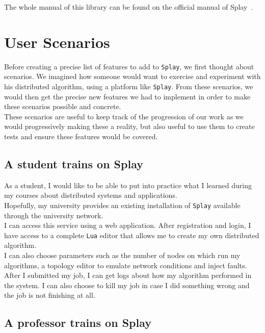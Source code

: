 \documentclass{eplmastersthesis}
\begin{document}
          The whole manual of this library can be found on the official
          manual of Splay~\cite{SplayLib}.


    \section{User Scenarios}

      Before creating a precise list of features to add to \texttt{Splay}, we first
      thought about scenarios. We imagined how someone would want to exercise
      and experiment with his distributed algorithm, using a platform like
      \texttt{Splay}. From these scenarios, we would then get the precise new features
      we had to implement in order to make these scenarios possible and
      concrete.\\

      These scenarios are useful to keep track of the progression of our
      work as we would progressively making these a reality, but also useful
      to use them to create tests and ensure these features would be covered.

      \subsection{A student trains on Splay}

        As a student, I would like to be able to put into practice what I learned
        during my courses about distributed systems and applications.\\
        Hopefully, my university provides an existing installation of \texttt{Splay}
        available through the university network.\\
        I can access this service using a web application. After
        registration and login, I have access to a complete \texttt{Lua} editor that
        allows me to create my own distributed algorithm.\\
        I can also choose parameters such as the number of nodes on
        which run my algorithms, a topology editor to emulate network
        conditions and inject faults.\\
        After I submitted my job, I can get logs about how my algorithm
        performed in the system. I can also choose to kill my job in case
        I did something wrong and the job is not finishing at all.

      \subsection{A professor trains on Splay}
\end{document}

